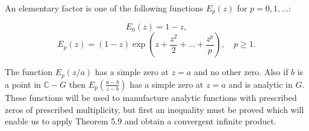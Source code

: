 An elementary factor is one of the following functions $E_p(z)$ for $p = 0, 1, \ldots$:

$$E_0(z) = 1 - z,$$
$$E_p(z) = (1 - z) \exp \left( z + \frac{z^2}{2} + \ldots + \frac{z^p}{p} \right), \quad p \geq 1.$$

The function $E_p(z/a)$ has a simple zero at $z = a$ and no other zero. Also if $b$ is a point in $\mathbb{C} - G$ then $E_p\left(\frac{a-b}{z-b}\right)$ has a simple zero at $z = a$ and is analytic in $G$. These functions will be used to manufacture analytic functions with prescribed zeros of prescribed multiplicity, but first an inequality must be proved which will enable us to apply Theorem 5.9 and obtain a convergent infinite product.